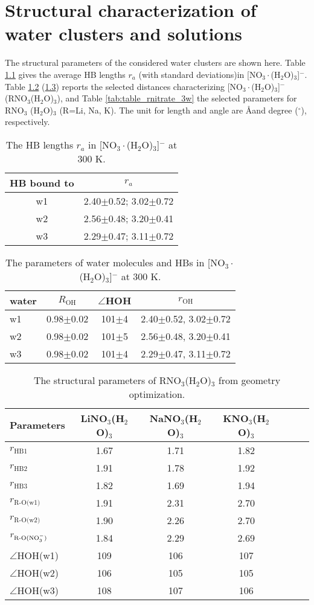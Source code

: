 \chapter{Structural characterization of water clusters and solutions}\label{structure_of_clusters}
The structural parameters of the considered water clusters are shown here.
Table \ref{tab:3_nitrate_bond} gives the average HB lengths $r_a$ (with standard deviations)in [NO$_3\cdot$(H$_2$O)$_3$]$^-$.  
Table \ref{tab:3w_nitrate} (\ref{tab:table_geo_opt}) reports the selected distances characterizing 
[NO$_3\cdot$(H$_2$O)$_3$]$^-$ (RNO$_3$(H$_2$O)$_3$), and Table \ref{tab:table_rnitrate_3w} the selected parameters for RNO$_3$   
 (H$_2$O)$_3$ (R=Li, Na, K).
The unit for length and angle are \AA and degree ($^\circ$), respectively.
% 
\begin{table}[!h]
\centering
\caption{\label{tab:3_nitrate_bond}%
The HB lengths $r_a$ in [NO$_3\cdot$(H$_2$O)$_3$]$^-$ at 300 K.} 
\begin{tabular}{cc} \\\toprule
 HB bound to & \multicolumn{1}{c}{ $r_a$} \\
\hline
 w1 &2.40$\pm$0.52; 3.02$\pm$0.72 \\
 w2 &2.56$\pm$0.48; 3.20$\pm$0.41 \\
 w3 &2.29$\pm$0.47; 3.11$\pm$0.72
\end{tabular}
\end{table}
%
\begin{table}[!htbp]
\centering
\caption{\label{tab:3w_nitrate}%
The parameters of water molecules and HBs in [NO$_3\cdot$(H$_2$O)$_3$]$^-$ at 300 K.}
\begin{tabular}{lccc}
water &$R_\text{OH}$ &$\angle$HOH & $r_\text{OH}$ \\
\hline
w1 &0.98$\pm$0.02 &101$\pm$4 & 2.40$\pm$0.52, 3.02$\pm$0.72 \\
w2 &0.98$\pm$0.02 &101$\pm$5 & 2.56$\pm$0.48, 3.20$\pm$0.41 \\
w3 &0.98$\pm$0.02 &101$\pm$4 & 2.29$\pm$0.47, 3.11$\pm$0.72
\end{tabular}
\end{table}
%
\begin{table}[!htbp]
\centering
\caption{\label{tab:table_geo_opt}%
  The structural parameters of RNO$_3$(H$_2$O)$_3$ from geometry optimization.} 
\begin{tabular}{l*{4}ccc}
Parameters  & LiNO$_3$(H$_2$O)$_3$& NaNO$_3$(H$_2$O)$_3$ & KNO$_3$(H$_2$O)$_3$\\
\hline
$r_\text{HB1}$& 1.67 & 1.71 & 1.82 \\
$r_\text{HB2}$& 1.91 & 1.78 & 1.92\\
$r_\text{HB3}$& 1.82 & 1.69 & 1.94\\
$r_\text{R-O(w1)}$ & 1.91 & 2.31 & 2.70\\
$r_\text{R-O(w2)}$ & 1.90 & 2.26 & 2.70\\
$r_\text{R-O(NO$_3^-$)}$ & 1.84 & 2.29 & 2.69 \\
$\angle$HOH(w1)& 109 & 106 &107 \\
$\angle$HOH(w2)& 106 & 105&105 \\
$\angle$HOH(w3)& 108 & 107 &106
\end{tabular}
\end{table}
